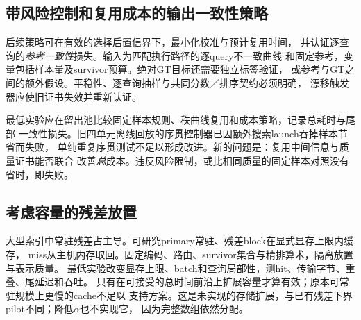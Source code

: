 \subsection{带风险控制和复用成本的输出一致性策略}
后续策略可在有效的选择后置信界下，最小化校准与预计复用时间，
并认证逐查询的\emph{参考一致性}损失。输入为匹配执行路径的逐query不一致曲线
和固定参考，变量包括样本量及survivor预算。绝对GT目标还需要独立标签验证，
或参考与GT之间的额外假设。平稳性、逐查询抽样与共同分数／排序契约必须明确，
漂移触发器应使旧证书失效并重新认证。

最低实验应在留出池比较固定样本规则、秩曲线复用和成本策略，记录总耗时与尾部
一致性损失。旧四单元离线回放的序贯控制器已因额外搜索launch吞掉样本节省而失败，
单纯重复序贯测试不足以形成改进。新的问题是：复用中间信息与质量证书能否联合
改善\emph{总}成本。违反风险限制，或比相同质量的固定样本对照没有省时，即失败。

\subsection{考虑容量的残差放置}
大型索引中常驻残差占主导。可研究primary常驻、残差block在显式显存上限内缓存，
miss从主机内存取回。固定编码、路由、survivor集合与精排算术，隔离放置与表示质量。
最低实验改变显存上限、batch和查询局部性，测hit、传输字节、重叠、尾延迟和吞吐。
只有在可接受的总时间前沿上扩展容量才算有效；原本可常驻规模上更慢的cache不足以
支持方案。这是未实现的存储扩展，与已有残差下界pilot不同；降低$\alpha$也不实现它，
因为完整数组依然分配。
